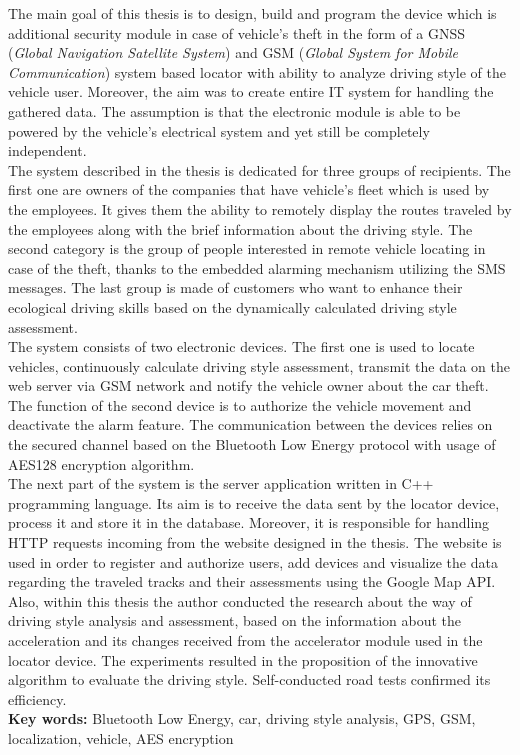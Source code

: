 \begin{singlespacing}


The main goal of this thesis is to design, build and program the device which is additional security module in case of vehicle's theft in the form of a GNSS (\textit{Global Navigation Satellite System}) and GSM (\textit{Global System for Mobile Communication}) system based locator with ability to analyze driving style of the vehicle user. Moreover, the aim was to create entire IT system for handling the gathered data. The assumption is that the electronic module is able to be powered by the vehicle's electrical system and yet still be completely independent. \\

The system described in the thesis is dedicated for three groups of recipients. The first one are owners of the companies that have vehicle's fleet which is used by the employees. It gives them the ability to remotely display the routes traveled by the employees along with the brief information about the driving style. The second category is the group of people interested in remote vehicle locating in case of the theft, thanks to the embedded alarming mechanism utilizing the SMS messages. The last group is made of customers who want to enhance their ecological driving skills based on the dynamically calculated driving style assessment. \\

The system consists of two electronic devices. The first one is used to locate vehicles,  continuously calculate driving style assessment, transmit the data on the web server via GSM network and notify the vehicle owner about the car theft. The function of the second device is to authorize the vehicle movement and deactivate the alarm feature. The communication between the devices relies on the secured channel based on the Bluetooth Low Energy protocol with usage of AES128 encryption algorithm. \\

The next part of the system is the server application written in C++ programming language. Its aim is to receive the data sent by the locator device, process it and store it in the database. Moreover, it is responsible for handling HTTP requests incoming from the website designed in the thesis. The website is used in order to register and authorize users, add devices and visualize the data regarding the traveled tracks and their assessments using the Google Map API. \\

Also, within this thesis the author conducted the research about the way of driving style analysis and assessment, based on the information about the acceleration and its changes received from the accelerator module used in the locator device. The experiments resulted in the proposition of the innovative algorithm to evaluate the driving style. Self-conducted road tests confirmed its efficiency. \\

\flushbottom
\textbf{Key words: }Bluetooth Low Energy, car, driving style analysis, GPS, GSM, localization, vehicle, AES encryption
\end{singlespacing}

